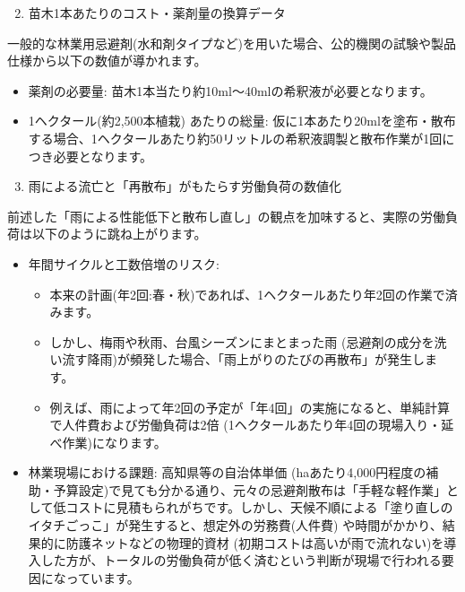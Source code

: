 \documentclass[a4paper, 11pt]{jsarticle}
\begin{document}
\begin{enumerate}
    \setcounter{enumi}{1}
    \item 苗木1本あたりのコスト・薬剤量の換算データ
\end{enumerate}
一般的な林業用忌避剤(水和剤タイプなど)を用いた場合、公的機関の試験や製品仕様から以下の数値が導かれます。
\begin{itemize}
    \item 薬剤の必要量: 苗木1本当たり約10ml〜40mlの希釈液が必要となります\cite{ref6,ref7}。
    \item 1ヘクタール(約2,500本植栽) あたりの総量: 仮に1本あたり20mlを塗布・散布する場合、1ヘクタールあたり約50リットルの希釈液調製と散布作業が1回につき必要となります。
\end{itemize}
\begin{enumerate}
    \setcounter{enumi}{2}
    \item 雨による流亡と「再散布」がもたらす労働負荷の数値化
\end{enumerate}
前述した「雨による性能低下と散布し直し」の観点を加味すると、実際の労働負荷は以下のように跳ね上がります。
\begin{itemize}
    \item 年間サイクルと工数倍増のリスク:
    \begin{itemize}
        \item[○] 本来の計画(年2回:春・秋)であれば、1ヘクタールあたり年2回の作業で済みます。
        \item[○] しかし、梅雨や秋雨、台風シーズンにまとまった雨 (忌避剤の成分を洗い流す降雨)が頻発した場合、「雨上がりのたびの再散布」が発生します。
        \item[○] 例えば、雨によって年2回の予定が「年4回」の実施になると、単純計算で人件費および労働負荷は2倍 (1ヘクタールあたり年4回の現場入り・延べ作業)になります。
    \end{itemize}
    \item 林業現場における課題: 高知県等の自治体単価 (haあたり4,000円程度の補助・予算設定)で見ても分かる通り、元々の忌避剤散布は「手軽な軽作業」として低コストに見積もられがちです。しかし、天候不順による「塗り直しのイタチごっこ」が発生すると、想定外の労務費(人件費) や時間がかかり、結果的に防護ネットなどの物理的資材 (初期コストは高いが雨で流れない)を導入した方が、トータルの労働負荷が低く済むという判断が現場で行われる要因になっています。
\end{itemize}
\end{document}
